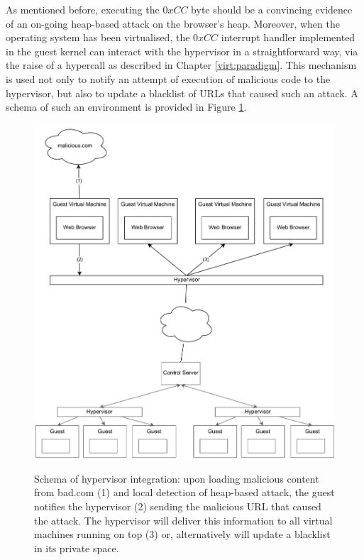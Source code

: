 As mentioned before, executing the $0xCC$ byte should be a convincing evidence of an on-going heap-based attack on the browser's heap. Moreover, when the operating system has been virtualised, the $0xCC$ interrupt handler implemented in the guest kernel can interact with the hypervisor in a straightforward way, via the raise of a hypercall as described in Chapter \ref{virt:paradigm}. This mechanism is used not only to notify  an attempt of execution of malicious code to the hypervisor, but also to update a blacklist of URLs that caused such an attack.
A schema of such an environment is provided in Figure \ref{virtualdesktop}.

\begin{figure}[t]
\begin{center}
\includegraphics[scale=0.55]{images/virtualDesktop.pdf}
\caption{{Schema of hypervisor integration: upon loading malicious content from bad.com (1) and local detection of  heap-based attack, the guest notifies the hypervisor (2) sending the malicious URL that caused the attack. The hypervisor will deliver this information to all virtual machines running on top (3) or, alternatively will update a blacklist in its private space.}}
\vspace{0.3cm}
\label{virtualdesktop}
\end{center}
\end{figure}


